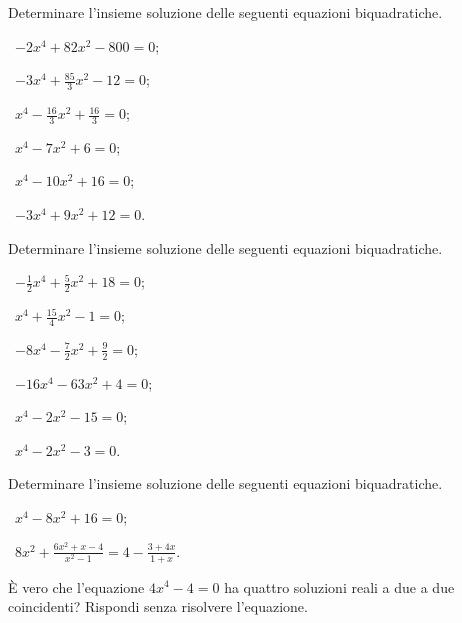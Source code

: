 \begin{esercizio}[\Ast]
 \label{ese:5.22}
Determinare l'insieme soluzione delle seguenti equazioni biquadratiche.
\begin{multicols}{3}
 \begin{enumeratea}
 \item~$-2x^4+82x^2-800=0$;
 \item~$-3x^4+\frac{85} 3x^2-12=0$;
 \item~$x^4-\frac{16} 3x^2+\frac{16} 3=0$;
 \item~$x^4-7x^2+6=0$;
 \item~$x^4-10x^2+16=0$;
 \item~$-3x^4+9x^2+12=0$.
 \end{enumeratea}
\end{multicols}
\end{esercizio}
\newpage
\begin{esercizio}[\Ast]
\label{ese:5.23}
Determinare l'insieme soluzione delle seguenti equazioni biquadratiche.
\begin{multicols}{3}
 \begin{enumeratea}
 \item~$-\frac 1 2x^4+\frac 5 2x^2+18=0$;
 \item~$x^4+\frac{15} 4x^2-1=0$;
 \item~$-8x^4-\frac 7 2x^2+\frac 9 2=0$;
 \item~$-16x^4-63x^2+4=0$;
 \item~$x^4-2x^2-15=0$;
 \item~$x^4-2x^2-3=0$.
 \end{enumeratea}
\end{multicols}
\end{esercizio}

\begin{esercizio}[\Ast]
\label{ese:5.24}
Determinare l'insieme soluzione delle seguenti equazioni biquadratiche.
\begin{multicols}{2}
 \begin{enumeratea}
 \item~$ x^4-8x^2+16=0 $;
 \item~$8x^2+\frac{6x^2+x-4}{x^2-1}=4-\frac{3+4x}{1+x}$.
 \end{enumeratea}
\end{multicols}
\end{esercizio}

\begin{esercizio}
\label{ese:5.25}
È vero che l’equazione $4x^4-4=0$ ha quattro soluzioni reali a due a due coincidenti? Rispondi senza risolvere l'equazione.
\end{esercizio}

